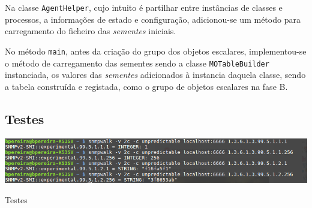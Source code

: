 Na classe \texttt{AgentHelper}, cujo intuito é partilhar entre instâncias de classes
e processos, a informações de estado e configuração, adicionou-se um método para
carregamento do ficheiro das \emph{sementes} iniciais.

No método \texttt{main}, antes da criação do grupo dos objetos escalares,
implementou-se o método de carregamento das sementes sendo a classe
\texttt{MOTableBuilder} instanciada, os valores das \emph{sementes} adicionados
à instancia daquela classe, sendo a tabela construída e registada, como o grupo
de objetos escalares na fase B.


\subsection{Testes}

\begin{center}
 	
 	\includegraphics[width=\textwidth,height=\textheight,keepaspectratio]{resources/images/faseC/faseC.png}
 	\captionsetup{type=figure, width=0.8\linewidth}
	\caption{Testes}
\label{fig:faseB:teste} 
\end{center}




